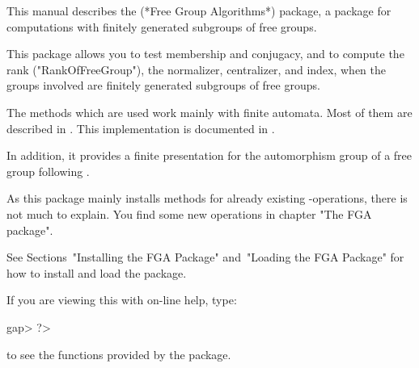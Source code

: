 

This manual describes the {\FGA} (*Free Group Algorithms*) package,
a {\GAP} package for computations with finitely generated subgroups of
free groups.

This package allows you to test membership and conjugacy, and to compute
the rank ("RankOfFreeGroup"), the normalizer, centralizer, and index,
when the groups involved are finitely generated subgroups of free groups.

The methods which are used work mainly with finite automata.
Most of them are described in \cite{sims94}.
This implementation is documented in \cite{sievers03}.

In addition, it provides a finite presentation for the automorphism group
of a free group following \cite{neumann33}.

As this package mainly installs methods for already existing
{\GAP}-operations, there is not much to explain.
You find some new operations in chapter "The FGA package".

See Sections~"Installing the FGA Package"  and~"Loading  the  FGA
Package" for how to install and load the {\FGA} package.

If you are viewing this with on-line help, type: 

\beginexample
gap> ?>
\endexample

to see the functions provided by the {\FGA} package.



